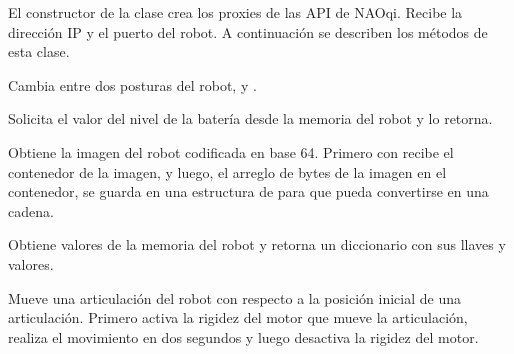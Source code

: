 El constructor de la clase crea los proxies de las API de NAOqi.
Recibe la dirección IP y el puerto del robot. A continuación
se describen los métodos de esta clase.

\begin{fulllineitems}
\label{\detokenize{nao_firebase:nao_robot.Robot.change_posture}}
Cambia entre dos posturas del robot,  y .
\end{fulllineitems}


\begin{fulllineitems}
\label{\detokenize{nao_firebase:nao_robot.Robot.get_battery_level}}
Solicita el valor del nivel de la batería desde la memoria del robot
y lo retorna.

\end{fulllineitems}

\begin{fulllineitems}
\label{\detokenize{nao_firebase:nao_robot.Robot.get_image_from_robot}}
Obtiene la imagen del robot codificada en base 64. Primero con
 recibe el contenedor de la imagen, y luego,
el arreglo de bytes de la imagen en el contenedor, se guarda en una
estructura de  para que pueda convertirse en una cadena.

\end{fulllineitems}


\begin{fulllineitems}
\label{\detokenize{nao_firebase:nao_robot.Robot.get_values_from_memory}}
Obtiene valores de la memoria del robot y retorna un diccionario
con sus llaves y valores.

\end{fulllineitems}


\begin{fulllineitems}
\label{\detokenize{nao_firebase:nao_robot.Robot.move_joint}}
Mueve una articulación del robot con respecto a la posición inicial de una
articulación. Primero activa la rigidez del motor que mueve la articulación, realiza el movimiento en dos
segundos y luego desactiva la rigidez del motor.

\end{fulllineitems}

